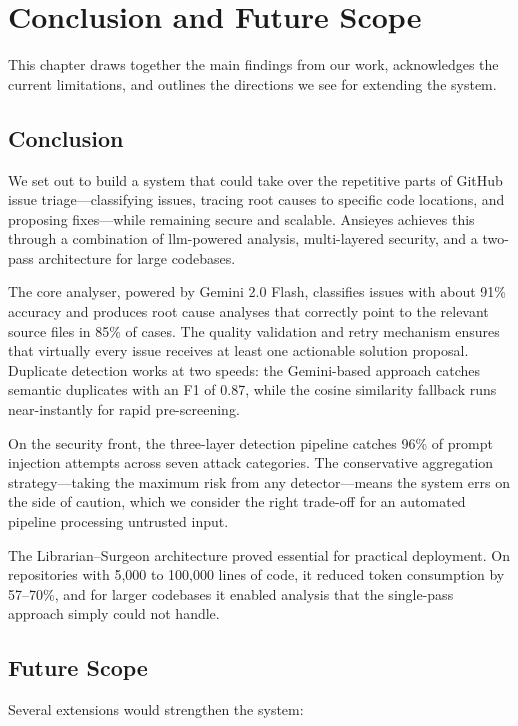 \chapter{Conclusion and Future Scope}

This chapter draws together the main findings from our work, acknowledges the current limitations, and outlines the directions we see for extending the system.

\section{Conclusion}

We set out to build a system that could take over the repetitive parts of GitHub issue triage---classifying issues, tracing root causes to specific code locations, and proposing fixes---while remaining secure and scalable. Ansieyes achieves this through a combination of \gls{llm}-powered analysis, multi-layered security, and a two-pass architecture for large codebases.

The core analyser, powered by Gemini 2.0 Flash, classifies issues with about 91\% accuracy and produces root cause analyses that correctly point to the relevant source files in 85\% of cases. The quality validation and retry mechanism ensures that virtually every issue receives at least one actionable solution proposal. Duplicate detection works at two speeds: the Gemini-based approach catches semantic duplicates with an F1 of 0.87, while the cosine similarity fallback runs near-instantly for rapid pre-screening.

On the security front, the three-layer detection pipeline catches 96\% of prompt injection attempts across seven attack categories. The conservative aggregation strategy---taking the maximum risk from any detector---means the system errs on the side of caution, which we consider the right trade-off for an automated pipeline processing untrusted input.

The Librarian--Surgeon architecture proved essential for practical deployment. On repositories with 5,000 to 100,000 lines of code, it reduced token consumption by 57--70\%, and for larger codebases it enabled analysis that the single-pass approach simply could not handle.

\section{Future Scope}

Several extensions would strengthen the system:

